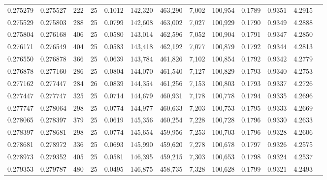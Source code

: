 \begin{tabular}{rrrrrrrrrrrrr}
0.275279 & 0.275527 &   222 &  25 &                                     0.1012 & 142,320 & 463,290 &   7,002 & 100,954 & 0.1789 & 0.9351 & 4.2915 \\
0.275529 & 0.275803 &   288 &  25 &                                     0.0799 & 142,608 & 463,002 &   7,027 & 100,929 & 0.1790 & 0.9349 & 4.2888 \\
0.275804 & 0.276168 &   406 &  25 &                                     0.0580 & 143,014 & 462,596 &   7,052 & 100,904 & 0.1791 & 0.9347 & 4.2850 \\
0.276171 & 0.276549 &   404 &  25 &                                     0.0583 & 143,418 & 462,192 &   7,077 & 100,879 & 0.1792 & 0.9344 & 4.2813 \\
0.276550 & 0.276878 &   366 &  25 &                                     0.0639 & 143,784 & 461,826 &   7,102 & 100,854 & 0.1792 & 0.9342 & 4.2779 \\
0.276878 & 0.277160 &   286 &  25 &                                     0.0804 & 144,070 & 461,540 &   7,127 & 100,829 & 0.1793 & 0.9340 & 4.2753 \\
0.277162 & 0.277447 &   284 &  26 &                                     0.0839 & 144,354 & 461,256 &   7,153 & 100,803 & 0.1793 & 0.9337 & 4.2726 \\
0.277447 & 0.277747 &   325 &  25 &                                     0.0714 & 144,679 & 460,931 &   7,178 & 100,778 & 0.1794 & 0.9335 & 4.2696 \\
0.277747 & 0.278064 &   298 &  25 &                                     0.0774 & 144,977 & 460,633 &   7,203 & 100,753 & 0.1795 & 0.9333 & 4.2669 \\
0.278065 & 0.278397 &   379 &  25 &                                     0.0619 & 145,356 & 460,254 &   7,228 & 100,728 & 0.1796 & 0.9330 & 4.2633 \\
0.278397 & 0.278681 &   298 &  25 &                                     0.0774 & 145,654 & 459,956 &   7,253 & 100,703 & 0.1796 & 0.9328 & 4.2606 \\
0.278681 & 0.278972 &   336 &  25 &                                     0.0693 & 145,990 & 459,620 &   7,278 & 100,678 & 0.1797 & 0.9326 & 4.2575 \\
0.278973 & 0.279352 &   405 &  25 &                                     0.0581 & 146,395 & 459,215 &   7,303 & 100,653 & 0.1798 & 0.9324 & 4.2537 \\
0.279353 & 0.279787 &   480 &  25 &                                     0.0495 & 146,875 & 458,735 &   7,328 & 100,628 & 0.1799 & 0.9321 & 4.2493 \\

\end{tabular}
